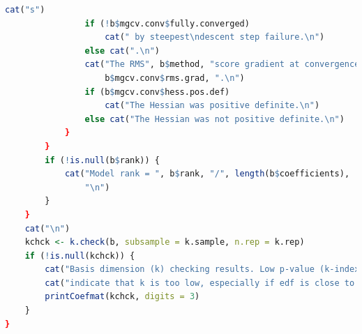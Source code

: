 \documentclass[
]{article}
\begin{document}
\begin{lstlisting}[language=R]
                    cat("s")
                if (!b$mgcv.conv$fully.converged)
                    cat(" by steepest\ndescent step failure.\n")
                else cat(".\n")
                cat("The RMS", b$method, "score gradient at convergence was",
                    b$mgcv.conv$rms.grad, ".\n")
                if (b$mgcv.conv$hess.pos.def)
                    cat("The Hessian was positive definite.\n")
                else cat("The Hessian was not positive definite.\n")
            }
        }
        if (!is.null(b$rank)) {
            cat("Model rank = ", b$rank, "/", length(b$coefficients),
                "\n")
        }
    }
    cat("\n")
    kchck <- k.check(b, subsample = k.sample, n.rep = k.rep)
    if (!is.null(kchck)) {
        cat("Basis dimension (k) checking results. Low p-value (k-index<1) may\n")
        cat("indicate that k is too low, especially if edf is close to k'.\n\n")
        printCoefmat(kchck, digits = 3)
    }
}
\end{lstlisting}
\end{document}
